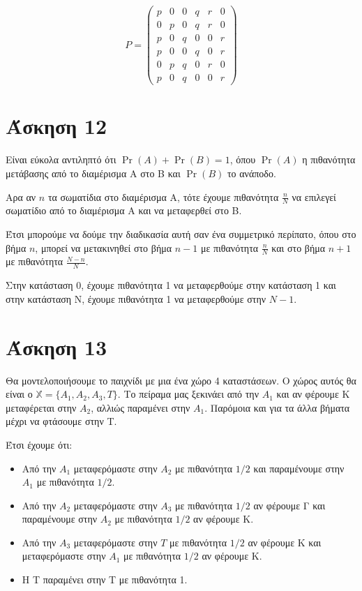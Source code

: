 \documentclass[11pt,a4paper]{article}
\begin{document}
\begin{equation*}
    P =
    \begin{pmatrix}
        p & 0 & 0 & q & r & 0 \\
        0 & p & 0 & q & r & 0 \\
        p & 0 & q & 0 & 0 & r \\
        p & 0 & 0 & q & 0 & r \\
        0 & p & q & 0 & r & 0 \\
        p & 0 & q & 0 & 0 & r
    \end{pmatrix}
\end{equation*}

\section*{Άσκηση 12}
Είναι εύκολα αντιληπτό ότι $\Pr(A) + \Pr(B) = 1$, όπου $\Pr(A)$ η πιθανότητα μετάβασης από το διαμέρισμα Α στο Β και $\Pr(B)$ το ανάποδο.

Αρα αν $n$ τα σωματίδια στο διαμέρισμα Α, τότε έχουμε πιθανότητα $\frac{n}{N}$ να επιλεγεί σωματίδιο από το διαμέρισμα Α και να μεταφερθεί στο Β.

Έτσι μπορούμε να δούμε την διαδικασία αυτή σαν ένα συμμετρικό περίπατο, όπου στο βήμα $n$, μπορεί να μετακινηθεί στο βήμα $n-1$ με πιθανότητα $\frac{n}{N}$ και στο βήμα $n+1$ με πιθανότητα $\frac{N-n}{N}$.

Στην κατάσταση 0, έχουμε πιθανότητα 1 να μεταφερθούμε στην κατάσταση 1 και στην κατάσταση Ν, έχουμε πιθανότητα 1 να μεταφερθούμε στην $N-1$.

\section*{Άσκηση 13}

Θα μοντελοποιήσουμε το παιχνίδι με μια ένα χώρο 4 καταστάσεων. Ο χώρος αυτός θα είναι ο $\mathbb{X} = \{A_1, A_2, A_3, T\}$. Το πείραμα μας ξεκινάει από την $A_1$ και αν φέρουμε Κ μεταφέρεται στην $A_2$, αλλιώς παραμένει στην $A_1$. Παρόμοια και για τα άλλα βήματα μέχρι να φτάσουμε στην Τ.

Έτσι έχουμε ότι:
\begin{itemize}
    \item Από την $A_1$ μεταφερόμαστε στην $A_2$ με πιθανότητα $1/2$ και παραμένουμε στην $A_1$ με πιθανότητα $1/2$.
    \item Από την $A_2$ μεταφερόμαστε στην $A_3$ με πιθανότητα $1/2$ αν φέρουμε Γ και παραμένουμε στην $A_2$ με πιθανότητα $1/2$ αν φέρουμε Κ.
    \item  Από την $A_3$ μεταφερόμαστε στην $T$ με πιθανότητα $1/2$ αν φέρουμε Κ και μεταφερόμαστε στην $A_1$ με πιθανότητα $1/2$ αν φέρουμε Κ.
    \item Η Τ παραμένει στην Τ με πιθανότητα 1.
\end{itemize}
\end{document}
